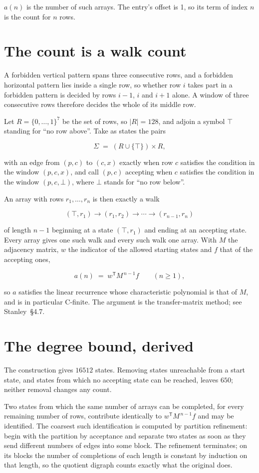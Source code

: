 \documentclass[11pt]{article}
\theoremstyle{definition}
\begin{document}
$a(n)$ is the number of such arrays. The entry's offset is 1, so its term of index $n$ is the count for $n$ rows.

\section{The count is a walk count}

A forbidden vertical pattern spans three consecutive rows, and a forbidden horizontal pattern lies inside a single row, so whether row $i$ takes part in a forbidden pattern is decided by rows $i-1$, $i$ and $i+1$ alone. A window of three consecutive rows therefore decides the whole of its middle row.

Let $R = \{0,\dots,1\}^{7}$ be the set of rows, so $|R| = 128$, and adjoin a symbol $\top$ standing for ``no row above''. Take as states the pairs

\[\Sigma \;=\; (R \cup \{\top\}) \times R,\]

with an edge from $(p,c)$ to $(c,x)$ exactly when row $c$ satisfies the condition in the window $(p,c,x)$, and call $(p,c)$ accepting when $c$ satisfies the condition in the window $(p,c,\bot)$, where $\bot$ stands for ``no row below''.

An array with rows $r_1,\dots,r_n$ is then exactly a walk

\[(\top,r_1) \to (r_1,r_2) \to \cdots \to (r_{n-1},r_n)\]

of length $n-1$ beginning at a state $(\top,r_1)$ and ending at an accepting state. Every array gives one such walk and every such walk one array. With $M$ the adjacency matrix, $w$ the indicator of the allowed starting states and $f$ that of the accepting ones,

\[a(n) \;=\; w^{\mathsf T} M^{\,n-1} f \qquad (n \ge 1),\]

so $a$ satisfies the linear recurrence whose characteristic polynomial is that of $M$, and is in particular C-finite. The argument is the transfer-matrix method; see Stanley~\S4.7.

\section{The degree bound, derived}

The construction gives $16512$ states. Removing states unreachable from a start state, and states from which no accepting state can be reached, leaves $650$; neither removal changes any count.

Two states from which the same number of arrays can be completed, for every remaining number of rows, contribute identically to $w^{\mathsf T}M^{\,n-1}f$ and may be identified. The coarsest such identification is computed by partition refinement: begin with the partition by acceptance and separate two states as soon as they send different numbers of edges into some block. The refinement terminates; on its blocks the number of completions of each length is constant by induction on that length, so the quotient digraph counts exactly what the original does.
\end{document}
